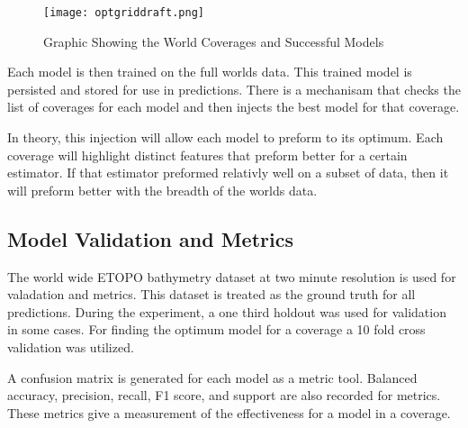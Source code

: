 \begin{figure}[h]
    \centering
    \texttt{[image: optgriddraft.png]}
    \caption{Graphic Showing the World Coverages and Successful Models}
    \label{fig:coveragegrid}
\end{figure}
\par
Each model is then trained on the full worlds data.
This trained model is persisted and stored for use in predictions.
There is a mechanisam that checks the list of coverages for each model and then injects the best model for that coverage.

\par
In theory, this injection will allow each model to preform to its optimum.
Each coverage will highlight distinct features that preform better for a certain estimator.
If that estimator preformed relativly well on a subset of data, then it will preform better with the breadth of the worlds data.


\subsection{Model Validation and Metrics}
The world wide ETOPO bathymetry dataset \cite{national1988etopo} at two minute resolution is used for valadation and metrics.
This dataset is treated as the ground truth for all predictions.
During the experiment, a one third holdout was used for validation in some cases.
For finding the optimum model for a coverage a 10 fold cross validation was utilized.


\par
A confusion matrix is generated for each model as a metric tool.
Balanced accuracy, precision, recall, F1 score, and support are also recorded for metrics.
These metrics give a measurement of the effectiveness for a model in a coverage.

